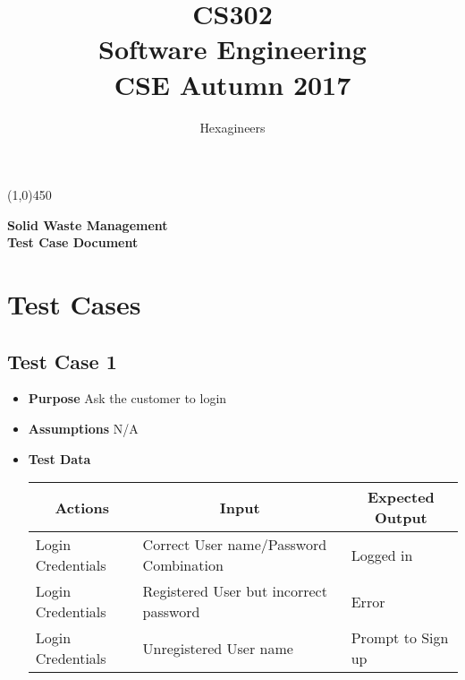 \documentclass{article}
\title{\textbf{CS302}\\\HUGE Software Engineering\\
\LARGE CSE\hspace{\labelsep}\textbullet\hspace{\labelsep} Autumn 2017
}
\author{Hexagineers}
\begin{document}
\maketitle
\line(1,0){450}

\begin{center}
\textbf{\Huge Solid Waste Management\\\Large Test Case Document} 

\end{center}
\newpage
\tableofcontents
\newpage
\section {Test Cases}
\subsection{Test Case 1}
\begin{itemize}
\item \textbf{Purpose}
Ask the customer to login
\item \textbf{Assumptions}
N/A
\item \textbf{Test Data}
\begin{table}[h]

\begin{tabular}{|l|l|l|}
\hline
\multicolumn{1}{|c|}{\textbf{Actions}} & \multicolumn{1}{c|}{\textbf{Input}}    & \multicolumn{1}{c|}{\textbf{Expected Output}} \\ \hline
Login Credentials                      & Correct User name/Password Combination  & Logged in                            \\ \hline
Login Credentials                      & Registered User but incorrect password & Error                                \\ \hline
Login Credentials                      & Unregistered User name                  & Prompt to Sign up                    \\ \hline
\end{tabular}
\end{table}
\end{itemize}
\end{document}
